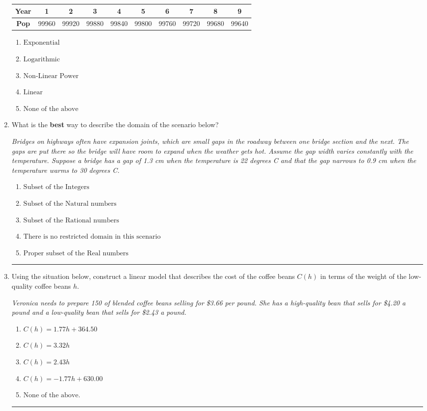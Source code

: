 \documentclass[14pt]{extbook}
\newcommand{\litem}[1]{\item#1\hspace*{-1cm}\rule{\textwidth}{0.4pt}}
\begin{document}
\begin{enumerate}
{\begin{tabular}{c|c|c|c|c|c|c|c|c|c}
\textbf{Year} &1 &2 &3 &4 &5 &6 &7 &8 &9\tabularnewline \hline
\textbf{Pop} &99960 &99920 &99880 &99840 &99800 &99760 &99720 &99680 &99640\end{tabular}\begin{enumerate}[label=\Alph*.]
\item \( \text{Exponential} \)
\item \( \text{Logarithmic} \)
\item \( \text{Non-Linear Power} \)
\item \( \text{Linear} \)
\item \( \text{None of the above} \)

\end{enumerate} }
\litem{
What is the \textbf{best} way to describe the domain of the scenario below?
\begin{center}
    \textit{ Bridges on highways often have expansion joints, which are small gaps in the roadway between one bridge section and the next. The gaps are put there so the bridge will have room to expand when the weather gets hot. Assume the gap width varies constantly with the temperature. Suppose a bridge has a gap of 1.3 cm when the temperature is 22 degrees C and that the gap narrows to 0.9 cm when the temperature warms to 30 degrees C. }
\end{center}
\begin{enumerate}[label=\Alph*.]
\item \( \text{Subset of the Integers} \)
\item \( \text{Subset of the Natural numbers} \)
\item \( \text{Subset of the Rational numbers} \)
\item \( \text{There is no restricted domain in this scenario} \)
\item \( \text{Proper subset of the Real numbers} \)

\end{enumerate} }
\litem{
Using the situation below, construct a linear model that describes the cost of the coffee beans $C(h)$ in terms of the weight of the low-quality coffee beans $h$.
\begin{center}
    \textit{ Veronica needs to prepare 150 of blended coffee beans selling for \$3.66 per pound. She has a high-quality bean that sells for \$4.20 a pound and a low-quality bean that sells for \$2.43 a pound. }
\end{center}
\begin{enumerate}[label=\Alph*.]
\item \( C(h) = 1.77 h + 364.50 \)
\item \( C(h) = 3.32 h \)
\item \( C(h) = 2.43 h \)
\item \( C(h) = -1.77 h + 630.00 \)
\item \( \text{None of the above.} \)


\end{enumerate}}
\end{enumerate}
\end{document}
